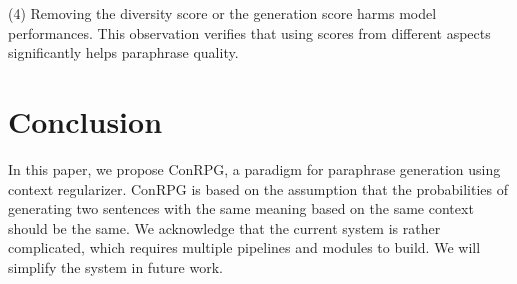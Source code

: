 \documentclass[11pt,a4paper]{article}
\begin{document}
(4) Removing the diversity score or the generation score  harms model performances. This observation verifies that using scores from different aspects significantly helps 
 paraphrase quality.

\begin{table}[t]
    \centering
    \small
    \caption{The effect of different modules within ConRPG. {\it w/o filtering} means removing the filtering phase and randomly choosing a paraphrase pair for each context. {\it w/o backward} means removing the $p(\bm{c}_{<i}|\bm{c}_i,\bm{c}_{>i})$  and  $p(\bm{c}_{>i}|\bm{c}_{<i},\bm{c}_i)$ training objectives. {\it w/o right-to-left} means removing the $p(\overleftarrow{\bm{c}}_i|\bm{c}_{<i},\bm{c}_{>i})$ training objective. {\it w/o diversity} means removing the diversity score and {\it w/o generation} means removing the generation score.}
    \label{tab:module}
\end{table}   

\section{Conclusion}
In this paper, we propose  ConRPG, a  paradigm for paraphrase generation using context regularizer. ConRPG is 
based on the assumption that the probabilities of generating two sentences with the same meaning based on the same context should be the same.
We acknowledge that the current system is rather complicated, which requires multiple pipelines and modules  to  build.
We will simplify the system in future work.



\end{document}

